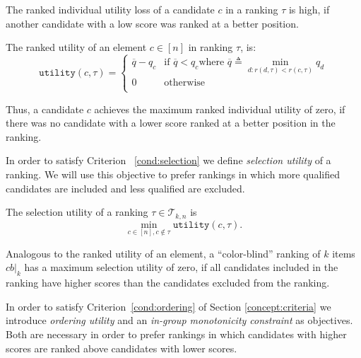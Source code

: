 The ranked individual utility loss of a candidate $c$ in a ranking $\tau$ is high, if another candidate with a low score was ranked at a better position.

\begin{definition}
	\label{def:rankedIndividualFairness}
	The ranked utility of an element $c \in [n]$ in ranking $\tau$, is:
	\[
	\texttt{utility}(c,\tau) = \begin{cases}
	\overline{q} - q_c &\textrm{if~} \overline{q} < q_c \textrm{where~} \overline{q}\triangleq \min_{d: r(d,\tau) < r(c,\tau)} q_d  \\
	0 & \textrm{otherwise}\\
	\end{cases}
	\]
\end{definition}
%
\noindent Thus, a candidate $c$ achieves the maximum ranked individual utility of zero, if there was no candidate with a lower score ranked at a better position in the ranking.
%

%
In order to satisfy Criterion ~\ref{cond:selection} we define \emph{selection utility} of a ranking. We will use this objective to prefer rankings in which more qualified candidates are included and less qualified are excluded.
%
\begin{definition}
	\label{def:selectionFairness}
	The selection utility of a ranking
	$\tau \in {\mathcal T}_{k,n}$ is \[\min_{c \in [n], c \notin \tau} \texttt{utility}(c,\tau).\]
\end{definition}
%
\noindent Analogous to the ranked utility of an element, a ``color-blind'' ranking of $k$ items $\textit{cb}|_k$ has a maximum selection utility of zero, if all candidates included in the ranking have higher scores than the candidates excluded from the ranking.

%
In order to satisfy Criterion~\ref{cond:ordering} of Section \ref{concept:criteria} we introduce \emph{ordering utility} and an \emph{in-group monotonicity constraint} as objectives. Both are necessary in order to prefer rankings in which candidates with higher scores are ranked above candidates with lower scores.

